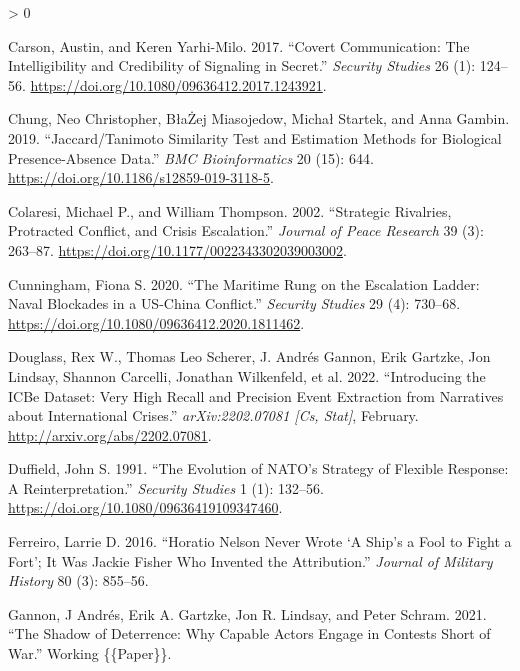 \documentclass[
]{article}
\newlength{\cslhangindent}
\newenvironment{CSLReferences}[2] %
 {%
  \setlength{\parindent}{0pt}
  \ifodd #1 \everypar{\setlength{\hangindent}{\cslhangindent}}\ignorespaces\fi
  \ifnum #2 > 0
  \setlength{\parskip}{#2\baselineskip}
  \fi
 }%
 {}
\begin{document}
\begin{CSLReferences}{1}{0}
\leavevmode\hypertarget{ref-carson_covertcommunicationintelligibility_2017}{}%
Carson, Austin, and Keren Yarhi-Milo. 2017. {``Covert {Communication}: {The Intelligibility} and {Credibility} of {Signaling} in {Secret}.''} \emph{Security Studies} 26 (1): 124--56. \url{https://doi.org/10.1080/09636412.2017.1243921}.

\leavevmode\hypertarget{ref-chung_jaccardtanimotosimilarity_2019}{}%
Chung, Neo Christopher, BłaŻej Miasojedow, Michał Startek, and Anna Gambin. 2019. {``Jaccard/{Tanimoto} Similarity Test and Estimation Methods for Biological Presence-Absence Data.''} \emph{BMC Bioinformatics} 20 (15): 644. \url{https://doi.org/10.1186/s12859-019-3118-5}.

\leavevmode\hypertarget{ref-colaresi_strategicrivalriesprotracted_2002}{}%
Colaresi, Michael P., and William Thompson. 2002. {``Strategic {Rivalries}, {Protracted Conflict}, and {Crisis Escalation}.''} \emph{Journal of Peace Research} 39 (3): 263--87. \url{https://doi.org/10.1177/0022343302039003002}.

\leavevmode\hypertarget{ref-cunningham_maritimerungescalation_2020}{}%
Cunningham, Fiona S. 2020. {``The {Maritime Rung} on the {Escalation Ladder}: {Naval Blockades} in a {US-China Conflict}.''} \emph{Security Studies} 29 (4): 730--68. \url{https://doi.org/10.1080/09636412.2020.1811462}.

\leavevmode\hypertarget{ref-douglass_introducingicbedataset_2022}{}%
Douglass, Rex W., Thomas Leo Scherer, J. Andrés Gannon, Erik Gartzke, Jon Lindsay, Shannon Carcelli, Jonathan Wilkenfeld, et al. 2022. {``Introducing the {ICBe Dataset}: {Very High Recall} and {Precision Event Extraction} from {Narratives} about {International Crises}.''} \emph{arXiv:2202.07081 {[}Cs, Stat{]}}, February. \url{http://arxiv.org/abs/2202.07081}.

\leavevmode\hypertarget{ref-duffield_evolutionnatostrategy_1991}{}%
Duffield, John S. 1991. {``The {Evolution} of {NATO}'s {Strategy} of {Flexible Response}: {A Reinterpretation}.''} \emph{Security Studies} 1 (1): 132--56. \url{https://doi.org/10.1080/09636419109347460}.

\leavevmode\hypertarget{ref-ferreiro_horationelsonnever_2016}{}%
Ferreiro, Larrie D. 2016. {``Horatio {Nelson Never Wrote} {`{A Ship}'s a {Fool} to {Fight} a {Fort}'}; {It Was Jackie Fisher Who Invented} the {Attribution}.''} \emph{Journal of Military History} 80 (3): 855--56.

\leavevmode\hypertarget{ref-gannon_shadowdeterrencewhy_2021}{}%
Gannon, J Andrés, Erik A. Gartzke, Jon R. Lindsay, and Peter Schram. 2021. {``The {Shadow} of {Deterrence}: {Why} Capable Actors Engage in Contests Short of War.''} Working \{\{Paper\}\}.


\end{CSLReferences}
\end{document}
